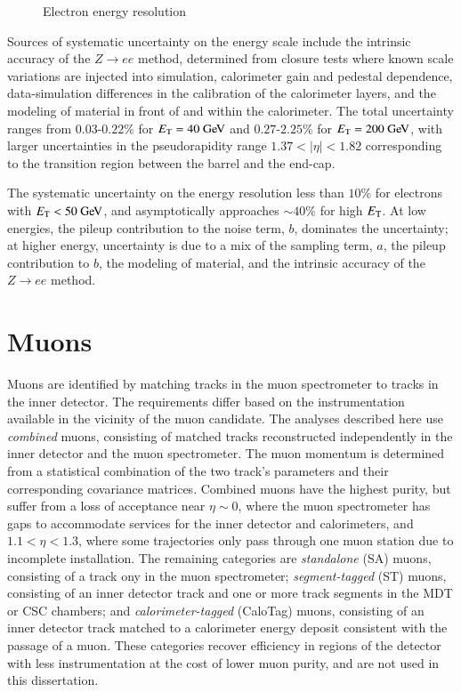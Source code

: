 \begin{figure}[htbp]
	\centering

	\caption{Electron energy resolution}
	\label{fig:reco-el-EER}
\end{figure}


Sources of systematic uncertainty on the energy scale include the intrinsic accuracy of the $Z\rightarrow ee$ method, determined from closure tests where known scale variations are injected into simulation, calorimeter gain and pedestal dependence, data-simulation differences in the calibration of the calorimeter layers, and the modeling of material in front of and within the calorimeter. The total uncertainty ranges from $0.03$-$0.22$\% for $\Et=40 \GeV$ and $0.27$-$2.25$\% for $\Et = 200 \GeV$, with larger uncertainties in the pseudorapidity range $1.37<|\eta|<1.82$ corresponding to the transition region between the barrel and the end-cap. 

The systematic uncertainty on the energy resolution less than $10\%$ for electrons with $\Et<50 \GeV$, and asymptotically approaches $\sim 40\%$ for high $E_{\mathrm{T}}$. At low energies, the pileup contribution to the noise term, $b$, dominates the uncertainty; at higher energy, uncertainty is due to a mix of the sampling term, $a$, the pileup contribution to $b$, the modeling of material, and the intrinsic accuracy of the $Z\rightarrow ee$ method.


\section{Muons}\label{sec:event-reconstruction-muons}
Muons are identified by matching tracks in the muon spectrometer to tracks in the inner detector. The requirements differ based on the instrumentation available in the vicinity of the muon candidate. The analyses described here use \emph{combined} muons, consisting of matched tracks reconstructed independently in the inner detector and the muon spectrometer. The muon momentum is determined from a statistical combination of the two track's parameters and their corresponding covariance matrices. Combined muons have the highest purity, but suffer from a loss of acceptance near $\eta\sim 0$, where the muon spectrometer has gaps to accommodate services for the inner detector and calorimeters, and $1.1<\eta<1.3$, where some trajectories only pass through one muon station due to incomplete installation. The remaining categories are \emph{standalone} (SA) muons, consisting of a track ony in the muon spectrometer; \emph{segment-tagged} (ST) muons, consisting of an inner detector track and one or more track segments in the MDT or CSC chambers; and \emph{calorimeter-tagged} (CaloTag) muons, consisting of an inner detector track matched to a calorimeter energy deposit consistent with the passage of a muon. These categories recover efficiency in regions of the detector with less instrumentation at the cost of lower muon purity, and are not used in this dissertation. 

